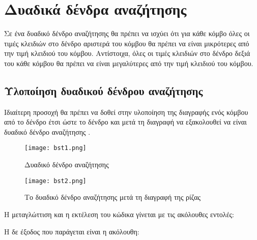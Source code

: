 \section{Δυαδικά δένδρα αναζήτησης}
\label{bst}
Σε ένα δυαδικό δένδρο αναζήτησης θα πρέπει να ισχύει ότι για κάθε κόμβο όλες οι τιμές κλειδιών στο δένδρο αριστερά του κόμβου θα πρέπει να είναι μικρότερες από την τιμή κλειδιού του κόμβου. Αντίστοιχα, όλες οι τιμές κλειδιών στο δένδρο δεξιά του κάθε κόμβου θα πρέπει να είναι μεγαλύτερες από την τιμή κλειδιού του κόμβου.

\subsection{Υλοποίηση δυαδικού δένδρου αναζήτησης}

Ιδιαίτερη προσοχή θα πρέπει να δοθεί στην υλοποίηση της διαγραφής ενός κόμβου από το δένδρο έτσι ώστε το δένδρο και μετά τη διαγραφή να εξακολουθεί να είναι δυαδικό δένδρο αναζήτησης \cite{jumping_into_cpp}. 

\begin{figure}[!tbp]
  \centering
  \begin{minipage}[b]{0.4\textwidth}
    \texttt{[image: bst1.png]}
    \label{fig:bst1}
        \caption{Δυαδικό δένδρο αναζήτησης}
  \end{minipage}
  \hfill
  \begin{minipage}[b]{0.35\textwidth}
    \texttt{[image: bst2.png]}
    \label{fig:bst2}
        \caption{Το δυαδικό δένδρο αναζήτησης μετά τη διαγραφή της ρίζας}
  \end{minipage}
\end{figure}







Η μεταγλώττιση και η εκτέλεση του κώδικα γίνεται με τις ακόλουθες εντολές:



Η δε έξοδος που παράγεται είναι η ακόλουθη:



